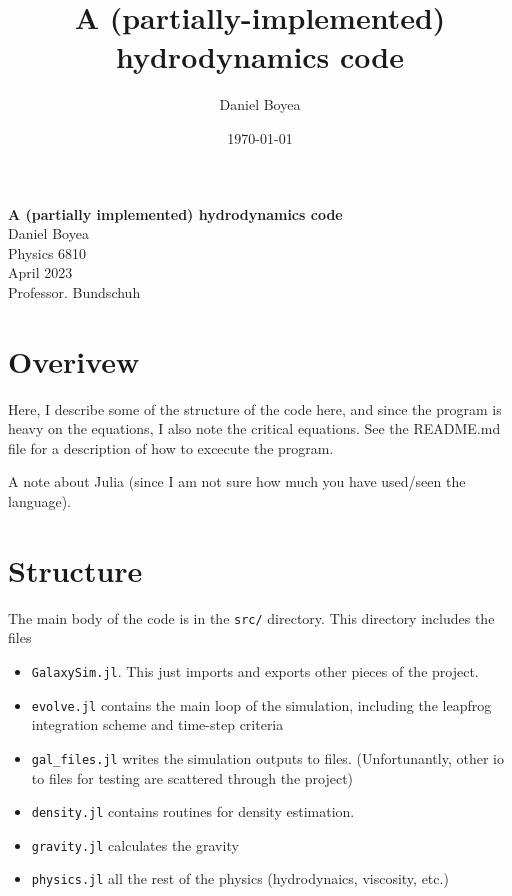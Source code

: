 \documentclass[12pt]{article}
\title{A (partially-implemented) hydrodynamics code}
\date{\today}
\author{Daniel Boyea}
\begin{document}
   \begin{center}
       {\bf A (partially implemented) hydrodynamics code}\\
       \vspace*{3\baselineskip}
       {Daniel Boyea}\\
       \vspace*{\baselineskip}
       Physics 6810\\
       \vspace*{\baselineskip}
       April 2023\\
       \vspace*{\baselineskip}
       Professor. Bundschuh
       \vspace*{3\baselineskip}
   \end{center}


\section{Overivew}
Here, I describe some of the structure of the code here, and since the program is heavy on the equations, I also note the critical equations. 
See the README.md file for a description of how to excecute the program. 

A note about Julia (since I am not sure how much you have used/seen the language). 

\section{Structure}
The main body of the code is in the \texttt{src/} directory. This directory includes the files
\begin{itemize}
    \item \texttt{GalaxySim.jl}. This just imports and exports other pieces of the project.
    \item \texttt{evolve.jl} contains the main loop of the simulation, including the leapfrog integration scheme and time-step criteria
    \item \verb|gal_files.jl| writes the simulation outputs to files. (Unfortunantly, other io to files for testing are scattered through the project)
    \item \texttt{density.jl} contains routines for density estimation.
    \item \texttt{gravity.jl} calculates the gravity
    \item \texttt{physics.jl} all the rest of the physics (hydrodynaics, viscosity, etc.)
\end{itemize}
\end{document}
